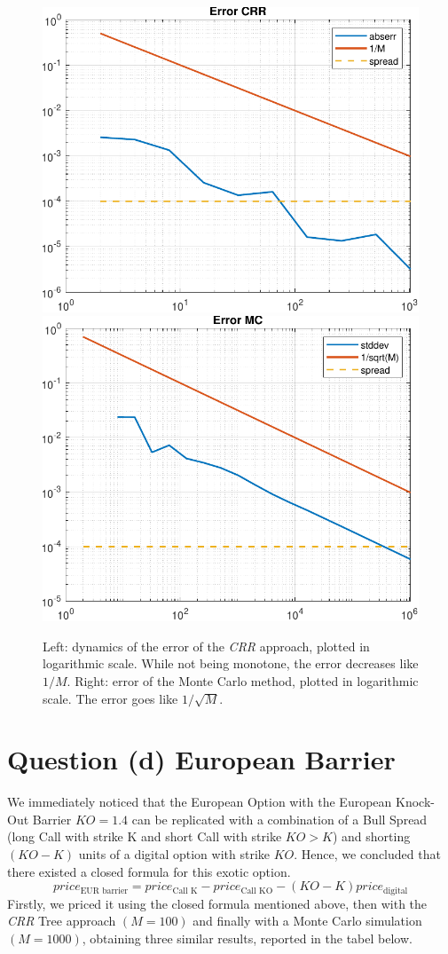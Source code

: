 \begin{figure}[htb!]
\centering
\includegraphics[width=0.45\linewidth]{imgs/err_crr.pdf}
\quad
\includegraphics[width=0.45\linewidth]{imgs/err_mc.pdf}
\caption{Left: dynamics of the error of the \textit{CRR} approach, plotted in logarithmic scale. While not being monotone, the error decreases like $1/M$. Right: error of the Monte Carlo method, plotted in logarithmic scale. The error goes like $1/\sqrt{M}$.}
\end{figure}

\vspace{1cm}
\section{Question (d) European Barrier}
We immediately noticed that the European Option with the European Knock-Out Barrier $KO = 1.4$ can be replicated with a combination of a Bull Spread (long Call with strike K and short Call with strike $KO>K$) and shorting $(KO-K)$ units of a digital option with strike $KO$. Hence, we concluded that there existed a closed formula for this exotic option. 
\begin{equation}
    price_\text{EUR barrier} = price_\text{Call K} - price_\text{Call KO} - (KO-K)price_\text{digital}
\end{equation}
Firstly, we priced it using the closed formula mentioned above, then with the \textit{CRR} Tree approach $(M=100)$ and finally with a Monte Carlo simulation $(M=1000)$, obtaining three similar results, reported in the tabel below.

